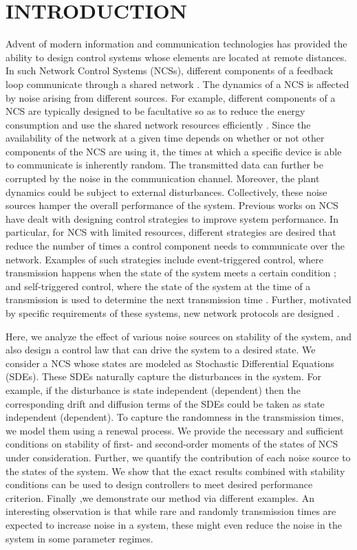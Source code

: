 \documentclass[letterpaper, 10 pt,one column, conference]{ieeeconf}  %
\begin{document}
\section{INTRODUCTION}
Advent of modern information and communication technologies has provided the ability to design control systems whose elements are located at remote distances. In such Network Control Systems (NCSs), different components of a feedback loop communicate through a shared network \cite{hes_05,HespanhaMar04,BohacekHespanhaLeeObraczkaJun03}. The dynamics of a NCS is affected by noise arising from different sources. For example, different components of a NCS are typically designed to be facultative so as to reduce the energy consumption and use the shared network resources efficiently \cite{lin07,gad14}. Since the availability of the network at a given time depends on whether or not other components of the NCS are using it, the times at which a specific device is able to communicate is inherently random. The transmitted data can further be corrupted by the noise in the communication channel. Moreover, the plant dynamics could be subject to external disturbances. Collectively, these noise sources hamper the overall performance of the system.  Previous works on NCS have dealt with designing control strategies to improve system performance. In particular, for NCS with limited resources, different strategies are desired that reduce the number of times a control component needs to communicate over the network. Examples of such strategies include event-triggered control, where transmission happens when the state of the system meets a certain condition \cite{tab07,hjt12,ank16}; and self-triggered control, where the state of the system at the time of a transmission is used to determine the next transmission time \cite{ant10,wal09,aah17}. Further, motivated by specific requirements of these systems, new network protocols are designed \cite{dan08}.


Here, we analyze the effect of various noise sources on stability of the system, and also design a control law that can drive the system to a desired state. We consider a NCS whose states are modeled as Stochastic Differential Equations (SDEs). These SDEs naturally capture the disturbances in the system. For example, if the disturbance is state independent (dependent) then the corresponding drift and diffusion terms of the SDEs could be taken as state independent (dependent). To capture the randomness in the transmission times, we model them using a renewal process. We provide the necessary and sufficient conditions on stability of first- and second-order moments of the states of NCS under consideration. Further, we quantify the contribution of each noise source to the states of the system. We show that the exact results combined with stability conditions can be used to design controllers to meet desired performance criterion. Finally ,we demonstrate our method via different examples. An interesting observation is that while rare and randomly transmission times are expected to increase noise in a system, these might even reduce the noise in the system in some parameter regimes. 
\end{document}
